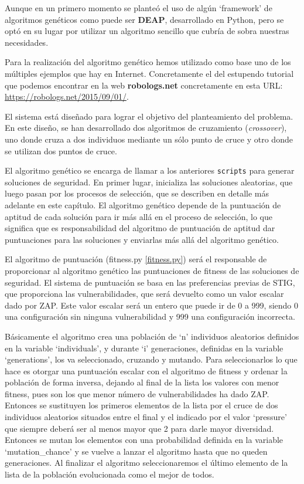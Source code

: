 \bigskip
Aunque en un primero momento se planteó el uso de algún `framework' de algoritmos genéticos como puede ser \textbf{DEAP}, desarrollado en Python, pero se optó en su lugar por utilizar un algoritmo sencillo que cubría de sobra nuestras necesidades.

\bigskip
Para la realización del algoritmo genético hemos utilizado como base uno de los múltiples ejemplos que hay en Internet. Concretamente el del estupendo tutorial que podemos encontrar en la web \textbf{robologs.net} concretamente en esta URL: \url{https://robologs.net/2015/09/01/}.

\bigskip
El sistema está diseñado para lograr el objetivo del planteamiento del problema. En este diseño, se han desarrollado dos algoritmos de cruzamiento (\textit{crossover}), uno donde cruza a dos individuos mediante un sólo punto de cruce y otro donde se utilizan dos puntos de cruce. 

\bigskip
El algoritmo genético se encarga de llamar a los anteriores \texttt{scripts} para generar soluciones de seguridad. En primer lugar, inicializa las soluciones aleatorias, que luego pasan por los procesos de selección, que se describen en detalle más adelante en este capítulo. El algoritmo genético depende de la puntuación de aptitud de cada solución para ir más allá en el proceso de selección, lo que significa que es responsabilidad del algoritmo de puntuación de aptitud dar puntuaciones para las soluciones y enviarlas más allá del algoritmo genético.

\bigskip
El algoritmo de puntuación (fitness.py \ref{fitness.py}) será el responsable de proporcionar al algoritmo genético las puntuaciones de fitness de las soluciones de seguridad. El sistema de puntuación se basa en las preferencias previas de STIG, que proporciona las vulnerabilidades, que será devuelto como un valor escalar dado por ZAP. Este valor escalar será un entero que puede ir de 0 a 999, siendo 0 una configuración sin ninguna vulnerabilidad y 999 una configuración incorrecta.

\bigskip
Básicamente el algoritmo crea una población de `n' individuos aleatorios definidos en la variable `individuals', y durante `i' generaciones, definidas en la variable `generations', los va seleccionado, cruzando y mutando. Para seleccionarlos lo que hace es otorgar una puntuación escalar con el algoritmo de fitness y ordenar la población de forma inversa, dejando al final de la lista los valores con menor fitness, pues son los que menor número de vulnerabilidades ha dado ZAP. Entonces se sustituyen los primeros elementos de la lista por el cruce de dos individuos aleatorios situados entre el final y el indicado por el valor `pressure' que siempre deberá ser al menos mayor que 2 para darle mayor diversidad. Entonces se mutan los elementos con una probabilidad definida en la variable `mutation\_chance' y se vuelve a lanzar el algoritmo hasta que no queden generaciones. Al finalizar el algoritmo seleccionaremos el último elemento de la lista de la población evolucionada como el mejor de todos.



